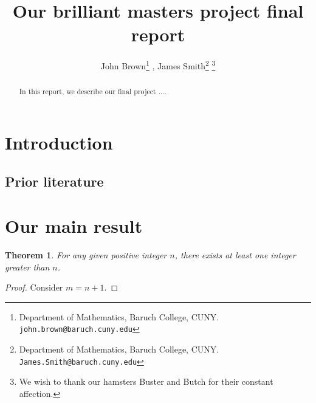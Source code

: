 \documentclass[12pt]{article}
\newtheorem{theorem}{Theorem}[section]
\numberwithin{equation}{section}
\begin{document}
\title{\bf Our brilliant masters project final report}

\author{John Brown\footnote{Department of Mathematics, Baruch College, CUNY. {\tt  john.brown@baruch.cuny.edu}}{\setcounter{footnote}{1}} , James Smith\footnote{Department of Mathematics, Baruch College, CUNY. {\tt  James.Smith@baruch.cuny.edu}}{\setcounter{footnote}{2}} \thanks{We wish to thank our hamsters Buster and Butch for their constant affection.}
}



\maketitle\thispagestyle{empty}
 



\begin{abstract}
In this report, we describe our final project ....
\end{abstract}

%
%
%
%

\section{Introduction}



\subsection{Prior literature}


\section{Our main result}

\begin{theorem}\label{thm:GreatTheorem}
For any given positive integer $n$, there exists at least one integer greater than $n$.
\end{theorem}

\begin{proof}
Consider $m=n+1$.     
\end{proof}
\end{document}
